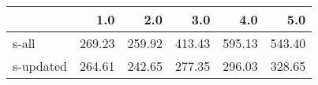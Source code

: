 \begin{tabular}{lrrrrr}
\toprule
{} &    1.0 &    2.0 &    3.0 &    4.0 &    5.0 \\
\midrule
s-all     & 269.23 & 259.92 & 413.43 & 595.13 & 543.40 \\
s-updated & 264.61 & 242.65 & 277.35 & 296.03 & 328.65 \\
\bottomrule
\end{tabular}

